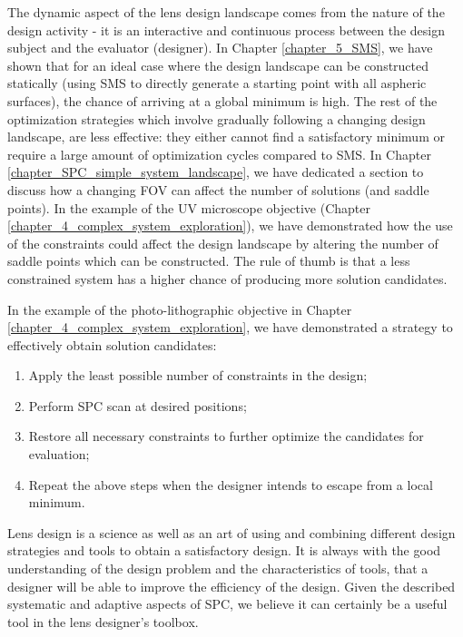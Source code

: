 The dynamic aspect of the lens design landscape comes from the nature of the design activity - it is an interactive and continuous process between the design subject and the evaluator (designer). In Chapter \ref{chapter_5_SMS}, we have shown that for an ideal case where the design landscape can be constructed statically (using SMS to directly generate a starting point with all aspheric surfaces), the chance of arriving at a global minimum is high. The rest of the optimization strategies which involve gradually following a changing design landscape, are less effective: they either cannot find a satisfactory minimum or require a large amount of optimization cycles compared to SMS. In Chapter \ref{chapter_SPC_simple_system_landscape}, we have dedicated a section to discuss how a changing FOV can affect the number of solutions (and saddle points). In the example of the UV microscope objective (Chapter \ref{chapter_4_complex_system_exploration}), we have demonstrated how the use of the constraints could affect the design landscape by altering the number of saddle points which can be constructed. The rule of thumb is that a less constrained system has a higher chance of producing more solution candidates. 

In the example of the photo-lithographic objective in Chapter \ref{chapter_4_complex_system_exploration}, we have demonstrated a strategy to effectively obtain solution candidates:

\begin{enumerate}[nosep]
\item Apply the least possible number of constraints in the design;
\item Perform SPC scan at desired positions;
\item Restore all necessary constraints to further optimize the candidates for evaluation; 
\item Repeat the above steps when the designer intends to escape from a local minimum.
\end{enumerate}


Lens design is a science as well as an art of using and combining different design strategies and tools to obtain a satisfactory design. It is always with the good understanding of the design problem and the characteristics of tools, that a designer will be able to improve the efficiency of the design. Given the described systematic and adaptive aspects of SPC, we believe it can certainly be a useful tool in the lens designer's toolbox.  

